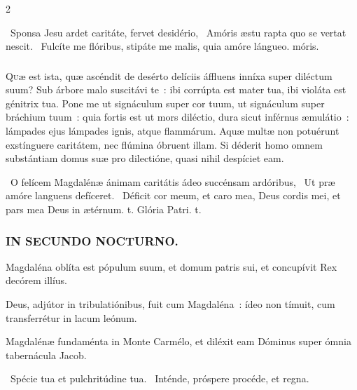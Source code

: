 \documentclass[9pt,twoside]{extarticle}
\begin{document}
\begin{multicols}{2}
{\begin{tightlist}{}
\item {}~Sponsa Jesu ardet caritáte, fervet desidério, \textred{*}~Amóris æstu rapta quo se vertat nescit. ~Fulcíte me flóribus, stipáte me malis, quia amóre lángueo. móris.
\end{tightlist}

\subsubsection*{\center {}}
\lettrine{Q}uæ est ista, quæ ascéndit de desérto delíciis áffluens inníxa super diléctum suum? Sub árbore malo suscitávi te~: ibi corrúpta est mater tua, ibi violáta est génitrix tua. Pone me ut signáculum super cor tuum, ut signáculum super bráchium tuum~: quia fortis est ut mors diléctio, dura sicut inférnus æmulátio~: lámpades ejus lámpades ignis, atque flammárum. Aquæ multæ non potuérunt exstínguere caritátem, nec flúmina óbruent illam. Si déderit homo omnem substántiam domus suæ pro dilectióne, quasi nihil despíciet eam.

\begin{tightlist}{}
\item {}~O felícem Magdalénæ ánimam caritátis ádeo succénsam ardóribus, \textred{*}~Ut præ amóre languens defíceret. ~Déficit cor meum, et caro mea, Deus cordis mei, et pars mea Deus in ætérnum. t. Glória Patri. t.
\end{tightlist}

\subsubsection*{\center \textsc{IN SECUNDO NOCTURNO.}}
\begin{tightlist}{}
\item {} Magdaléna oblíta est pópulum suum, et domum patris sui, et concupívit Rex decórem illíus.
\item {} Deus, adjútor in tribulatiónibus, fuit cum Magdaléna~: ídeo non tímuit, cum transferrétur in lacum leónum.
\item {} Magdalénæ fundaménta in Monte Carmélo, et diléxit eam Dóminus super ómnia tabernácula Jacob.
\item {}~Spécie tua et pulchritúdine tua. ~Inténde, próspere procéde, et regna.
\end{tightlist}

}
\end{multicols}
\end{document}
